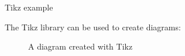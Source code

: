 \begin{frame}{Tikz example}

  The Tikz library can be used to create diagrams:
  
  \vspace{0.4cm}

  \begin{figure}
    \centering
    
    \caption{A diagram created with Tikz}
  \end{figure}

\end{frame}